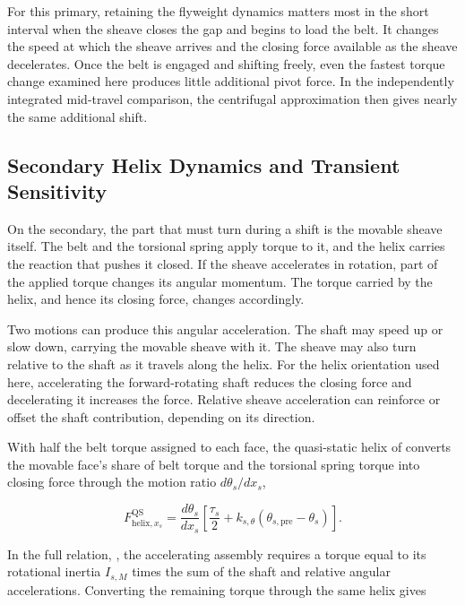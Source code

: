 \documentclass[11pt]{report}
\numberwithin{equation}{section}
\begin{document}
For this primary, retaining the flyweight dynamics matters most in the
short interval when the sheave closes the gap and begins to load the
belt. It changes the speed at which the sheave arrives and the closing
force available as the sheave decelerates. Once the belt is engaged
and shifting freely, even the fastest torque change examined here
produces little additional pivot force. In the independently integrated
mid-travel comparison, the centrifugal approximation then gives nearly
the same additional shift.
\FloatBarrier

\subsection{Secondary Helix Dynamics and Transient Sensitivity}
\label{sec:results_secondary_helix}

On the secondary, the part that must turn during a shift is the movable
sheave itself. The belt and the torsional spring apply torque to it, and
the helix carries the reaction that pushes it closed. If the sheave
accelerates in rotation, part of the applied torque changes its angular
momentum. The torque carried by the helix, and hence its closing force,
changes accordingly.

Two motions can produce this angular acceleration. The shaft may speed
up or slow down, carrying the movable sheave with it. The sheave may also
turn relative to the shaft as it travels along the helix. For the helix
orientation used here, accelerating the forward-rotating shaft reduces
the closing force and decelerating it increases the force. Relative
sheave acceleration can reinforce or offset the shaft contribution,
depending on its direction.

With half the belt torque assigned to each face, the quasi-static helix
of  converts the movable face's share
of belt torque and the torsional spring torque into closing force through
the motion ratio \(d\theta_s/dx_s\),

\begin{equation}
 F_{\mathrm{helix},x_s}^{\mathrm{QS}}
 =\frac{d\theta_s}{dx_s}
 \left[\frac{\tau_s}{2}
       +k_{s,\theta}(\theta_{s,\mathrm{pre}}-\theta_s)\right].
 \label{eq:results_secondary_qs_torque_recalled}
\end{equation}

In the full relation, , the
accelerating assembly requires a torque equal to its rotational inertia
\(I_{s,M}\) times the sum of the shaft and relative angular
accelerations. Converting the remaining torque through the same helix
gives
\end{document}
